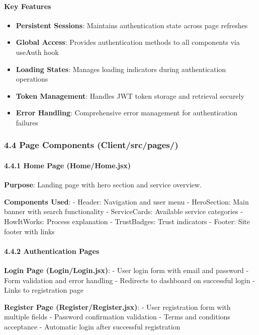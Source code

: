 \documentclass[12pt,a4paper]{article}
\begin{document}
\paragraph{Key Features}
\begin{itemize}
\item \textbf{Persistent Sessions}: Maintains authentication state across page refreshes
\item \textbf{Global Access}: Provides authentication methods to all components via useAuth hook
\item \textbf{Loading States}: Manages loading indicators during authentication operations
\item \textbf{Token Management}: Handles JWT token storage and retrieval securely
\item \textbf{Error Handling}: Comprehensive error management for authentication failures
\end{itemize}

\hypertarget{page-components-clientsrcpages}{%
\subsubsection{4.4 Page Components
(Client/src/pages/)}\label{page-components-clientsrcpages}}

\hypertarget{home-page-homehome.jsx}{%
\paragraph{4.4.1 Home Page
(Home/Home.jsx)}\label{home-page-homehome.jsx}}

\textbf{Purpose}: Landing page with hero section and service overview.

\textbf{Components Used}: - Header: Navigation and user menu -
HeroSection: Main banner with search functionality - ServiceCards:
Available service categories - HowItWorks: Process explanation -
TrustBadges: Trust indicators - Footer: Site footer with links

\hypertarget{authentication-pages}{%
\paragraph{4.4.2 Authentication Pages}\label{authentication-pages}}

\textbf{Login Page (Login/Login.jsx)}: - User login form with email and
password - Form validation and error handling - Redirects to dashboard
on successful login - Links to registration page

\textbf{Register Page (Register/Register.jsx)}: - User registration form
with multiple fields - Password confirmation validation - Terms and
conditions acceptance - Automatic login after successful registration
\end{document}
